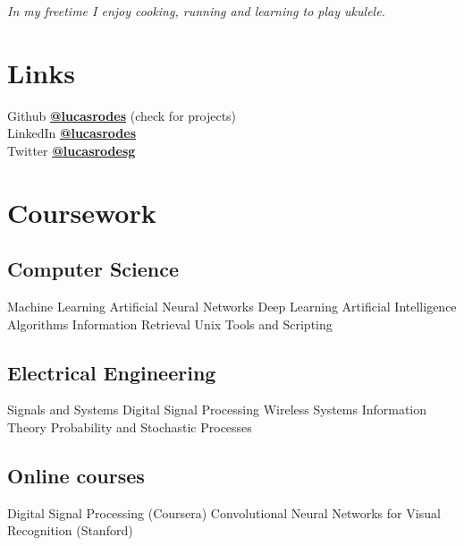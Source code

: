 \documentclass[]{deedy-resume}
\begin{document}
\begin{minipage}[t]{0.43\textwidth}
\sectionsep
\emph{In my freetime I enjoy cooking, running and learning to play ukulele.}


\section{Links}
Github \href{https://github.com/lucasrodes}{\bf @lucasrodes} (check for projects)\\
LinkedIn  \href{https://www.linkedin.com/in/lucasrodes}{\bf @lucasrodes} \\
Twitter  \href{https://www.twitter.com/lucasrodesg}{\bf @lucasrodesg} 


\section{Coursework}

\subsection{Computer Science}
Machine Learning \textbullet{} Artificial Neural Networks \textbullet{} Deep Learning \textbullet{} Artificial Intelligence \textbullet{} Algorithms \textbullet{} Information Retrieval  \textbullet{} Unix Tools and Scripting\\
\subsection{Electrical Engineering}
Signals and Systems \textbullet{} Digital Signal Processing \textbullet{} Wireless Systems \textbullet{} Information Theory \textbullet{} Probability and Stochastic Processes\\

\subsection{Online courses}
Digital Signal Processing (Coursera) \textbullet{} Convolutional Neural Networks for Visual Recognition (Stanford) 


\end{minipage}
\end{document}
